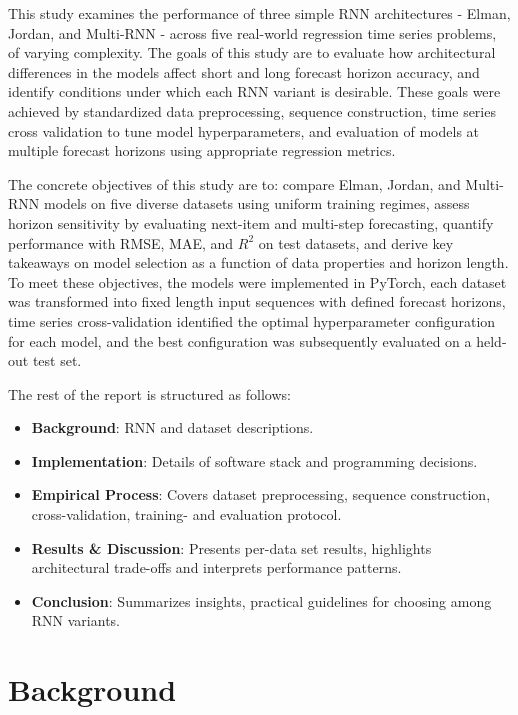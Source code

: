 \documentclass[conference]{IEEEtran}
\begin{document}
This study examines the performance of three simple RNN architectures - Elman, Jordan, and Multi-RNN - across five real-world regression time series problems, of varying complexity. The goals of this study are to evaluate how architectural differences in the models affect short and long forecast horizon accuracy, and identify conditions under which each RNN variant is desirable. These goals were achieved by standardized data preprocessing, sequence construction, time series cross validation to tune model hyperparameters, and evaluation of models at multiple forecast horizons using appropriate regression metrics.

The concrete objectives of this study are to: compare Elman, Jordan, and Multi-RNN models on five diverse datasets using uniform training regimes, assess horizon sensitivity by evaluating next-item and multi-step forecasting, quantify performance with RMSE, MAE, and $R^2$ on test datasets, and derive key takeaways on model selection as a function of data properties and horizon length. To meet these objectives, the models were implemented in PyTorch, each dataset was transformed into fixed length input sequences with defined forecast horizons, time series cross-validation identified the optimal hyperparameter configuration for each model, and the best configuration was subsequently evaluated on a held-out test set.

The rest of the report is structured as follows:

\begin{itemize}
    \item \textbf{Background}: RNN and dataset descriptions.
    \item \textbf{Implementation}: Details of software stack and programming decisions.
    \item \textbf{Empirical Process}: Covers dataset preprocessing, sequence construction, cross-validation, training- and evaluation protocol.
    \item \textbf{Results \& Discussion}: Presents per-data set results, highlights architectural trade-offs and interprets performance patterns.
    \item \textbf{Conclusion}: Summarizes insights, practical guidelines for choosing among RNN variants.
\end{itemize}

\section{\textbf{Background}}
\end{document}
